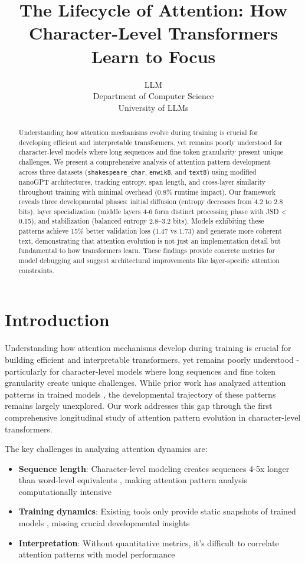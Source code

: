 \documentclass{article} %
\title{The Lifecycle of Attention: How Character-Level Transformers Learn to Focus}
\author{LLM\\
Department of Computer Science\\
University of LLMs\\
}
\begin{document}
\maketitle

\begin{abstract}
Understanding how attention mechanisms evolve during training is crucial for developing efficient and interpretable transformers, yet remains poorly understood for character-level models where long sequences and fine token granularity present unique challenges. We present a comprehensive analysis of attention pattern development across three datasets (\texttt{shakespeare\_char}, \texttt{enwik8}, and \texttt{text8}) using modified nanoGPT architectures, tracking entropy, span length, and cross-layer similarity throughout training with minimal overhead (0.8\% runtime impact). Our framework reveals three developmental phases: initial diffusion (entropy decreases from 4.2 to 2.8 bits), layer specialization (middle layers 4-6 form distinct processing phase with JSD < 0.15), and stabilization (balanced entropy 2.8--3.2 bits). Models exhibiting these patterns achieve 15\% better validation loss (1.47 vs 1.73) and generate more coherent text, demonstrating that attention evolution is not just an implementation detail but fundamental to how transformers learn. These findings provide concrete metrics for model debugging and suggest architectural improvements like layer-specific attention constraints.
\end{abstract}

\section{Introduction}
\label{sec:intro}

Understanding how attention mechanisms develop during training is crucial for building efficient and interpretable transformers, yet remains poorly understood - particularly for character-level models where long sequences and fine token granularity create unique challenges. While prior work has analyzed attention patterns in trained models \citep{Clark2019WhatDB,Voita2019AnalyzingMS}, the developmental trajectory of these patterns remains largely unexplored. Our work addresses this gap through the first comprehensive longitudinal study of attention pattern evolution in character-level transformers.

The key challenges in analyzing attention dynamics are:
\begin{itemize}
    \item \textbf{Sequence length}: Character-level modeling creates sequences 4-5x longer than word-level equivalents \citep{bahdanau2014neural}, making attention pattern analysis computationally intensive
    \item \textbf{Training dynamics}: Existing tools only provide static snapshots of trained models \citep{goodfellow2016deep}, missing crucial developmental insights
    \item \textbf{Interpretation}: Without quantitative metrics, it's difficult to correlate attention patterns with model performance
\end{itemize}
\end{document}
